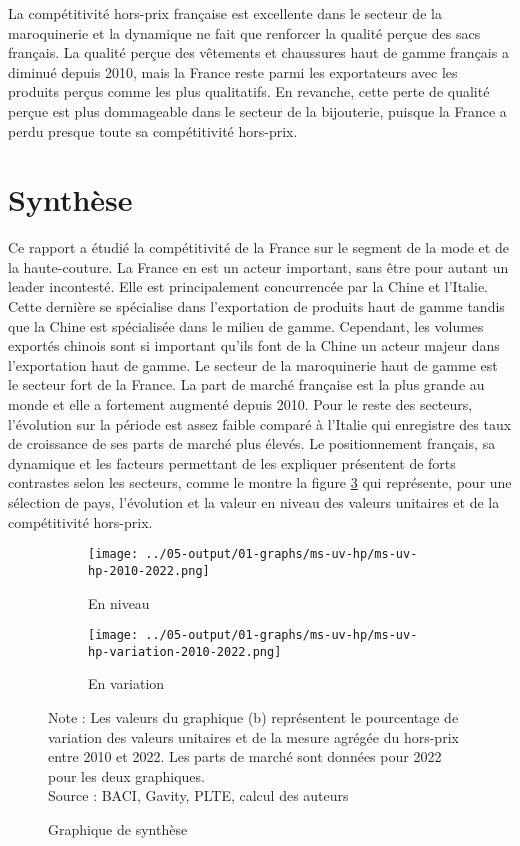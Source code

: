 \documentclass[french,10pt,a4paper]{article}
\begin{document}
La compétitivité hors-prix française est excellente dans le secteur de la maroquinerie et la dynamique ne fait que renforcer la qualité perçue des sacs français. La qualité perçue des vêtements et chaussures haut de gamme français a diminué depuis 2010, mais la France reste parmi les exportateurs avec les produits perçus comme les plus qualitatifs. En revanche, cette perte de qualité perçue est plus dommageable dans le secteur de la bijouterie, puisque la France a perdu presque toute sa compétitivité hors-prix.


\section{Synthèse}

Ce rapport a étudié la compétitivité de la France sur le segment de la mode et de la haute-couture. La France en est un acteur important, sans être pour autant un leader incontesté. Elle est principalement concurrencée par la Chine et l'Italie. Cette dernière se spécialise dans l'exportation de produits haut de gamme tandis que la Chine est spécialisée dans le milieu de gamme. Cependant, les volumes exportés chinois sont si important qu'ils font de la Chine un acteur majeur dans l'exportation haut de gamme. Le secteur de la maroquinerie haut de gamme est le secteur fort de la France. La part de marché française est la plus grande au monde et elle a fortement augmenté depuis 2010. Pour le reste des secteurs, l'évolution sur la période est assez faible comparé à l'Italie qui enregistre des taux de croissance de ses parts de marché plus élevés. Le positionnement français, sa dynamique et les facteurs permettant de les expliquer présentent de forts contrastes selon les secteurs, comme le montre la figure \ref{fig:graph-synthese} qui représente, pour une sélection de pays, l'évolution et la valeur en niveau des valeurs unitaires et de la compétitivité hors-prix.

\begin{figure}[!h]
  \centering
  \begin{subfigure}{\textwidth}
    \centering    \texttt{[image: ../05-output/01-graphs/ms-uv-hp/ms-uv-hp-2010-2022.png]}
    \caption{En niveau}
    \label{fig:ms-uv-hp}
  \end{subfigure}
  \vspace{0.5cm}
  \begin{subfigure}{\textwidth}
    \centering \texttt{[image: ../05-output/01-graphs/ms-uv-hp/ms-uv-hp-variation-2010-2022.png]}
 \caption{En variation}
 \label{fig:ms-uv-hp-variation}
  \end{subfigure}
  \captionsetup{justification=justified, singlelinecheck=false, font=small}
  \caption*{Note : Les valeurs du graphique (b) représentent le pourcentage de variation des valeurs unitaires et de la mesure agrégée du hors-prix entre 2010 et 2022. Les parts de marché sont données pour 2022 pour les deux graphiques.\\
  Source : BACI, Gavity, PLTE, calcul des auteurs}
  \captionsetup{justification=centering, singlelinecheck=true, font=normalsize}
  \caption{Graphique de synthèse}
  \label{fig:graph-synthese}
\end{figure}
\end{document}

